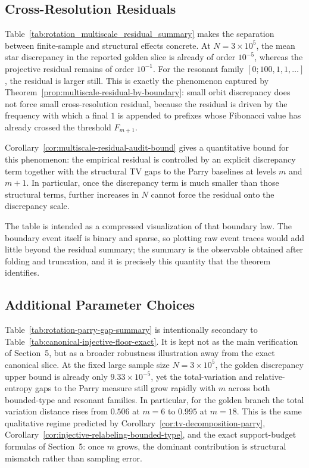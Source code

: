 \documentclass[11pt,letterpaper]{article}
\numberwithin{equation}{section}
\theoremstyle{plain}
\theoremstyle{definition}
\theoremstyle{remark}
\begin{document}
\subsection{Cross-Resolution Residuals}



Table~\ref{tab:rotation_multiscale_residual_summary} makes the separation
between finite-sample and structural effects concrete. At
\(N=3\times 10^5\), the mean star discrepancy in the reported golden slice is
already of order \(10^{-5}\), whereas the projective residual remains of order
\(10^{-1}\). For the resonant family \([0;100,1,1,\dots]\), the residual is
larger still. This is exactly the phenomenon captured by
Theorem~\ref{prop:multiscale-residual-by-boundary}: small orbit discrepancy
does not force small cross-resolution residual, because the residual is driven
by the frequency with which a final \(1\) is appended to prefixes whose
Fibonacci value has already crossed the threshold \(F_{m+1}\).

Corollary~\ref{cor:multiscale-residual-audit-bound} gives a quantitative bound
for this phenomenon: the empirical residual is controlled by an explicit
discrepancy term together with the structural TV gaps to the Parry baselines at
levels \(m\) and \(m+1\). In particular, once the discrepancy term is much
smaller than those structural terms, further increases in \(N\) cannot force
the residual onto the discrepancy scale.

The table is intended as a compressed visualization of that boundary law. The
boundary event itself is binary and sparse, so plotting raw event traces would
add little beyond the residual summary; the summary is the observable obtained
after folding and truncation, and it is precisely this quantity that the
theorem identifies.

\subsection{Additional Parameter Choices}



Table~\ref{tab:rotation-parry-gap-summary} is intentionally secondary to
Table~\ref{tab:canonical-injective-floor-exact}. It is kept not as the main
verification of Section~5, but as a broader robustness illustration away from
the exact canonical slice. At the fixed large sample size \(N=3\times 10^5\),
the golden discrepancy upper bound is already only \(9.33\times 10^{-5}\), yet
the total-variation and relative-entropy gaps to the Parry measure still grow
rapidly with \(m\) across both bounded-type and resonant families. In
particular, for the golden branch the total variation distance rises from
\(0.506\) at \(m=6\) to \(0.995\) at \(m=18\). This is the same qualitative
regime predicted by Corollary~\ref{cor:tv-decomposition-parry},
Corollary~\ref{cor:injective-relabeling-bounded-type}, and the exact
support-budget formulas of Section~5: once \(m\) grows, the dominant
contribution is structural mismatch rather than sampling error.
\end{document}
